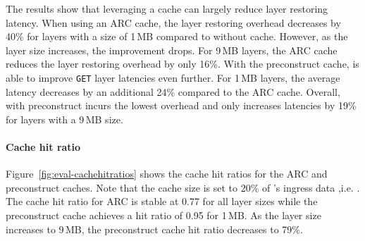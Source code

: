 %
The results show that
leveraging a cache can largely reduce layer restoring latency.
%
When using an ARC cache, the layer restoring overhead decreases by 40\% for layers with
a size of 1\,MB compared to \sysname without cache.
%
However, as the layer size increases,  the improvement drops.
%
For 9\,MB layers, the ARC cache reduces the layer restoring overhead by only 16\%.
%
%
With the preconstruct cache, \sysname is able to improve \texttt{GET} layer latencies even further.
%
For 1\,MB layers, the average latency decreases by an additional 24\% compared to the ARC cache.
%
Overall, \sysname with preconstruct incurs the lowest overhead and only increases latencies by
19\% for layers with a 9\,MB size. 

\paragraph{Cache hit ratio}
%
Figure~\ref{fig:eval-cachehitratios} shows the cache hit ratios for the ARC and
preconstruct caches.
%
Note that the cache size is set to 20\% of \dal{}'s ingress data ,i.e. \gap.
%
%
The cache hit ratio for ARC is stable at 0.77 for all layer sizes while
the preconstruct cache achieves a hit ratio of 0.95 for 1\,MB.
%
As the layer size increases to 9\,MB, the preconstruct cache hit ratio decreases to 79\%.

